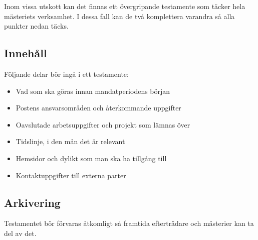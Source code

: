 \documentclass[]{dsekprotokoll}
\begin{document}
Inom vissa utskott kan det finnas ett övergripande testamente som täcker hela mästeriets verksamhet. I dessa fall kan de två komplettera varandra så alla punkter nedan täcks.

\subsection{Innehåll}
Följande delar bör ingå i ett testamente:
\begin{itemize}
    \item Vad som ska göras innan mandatperiodens början
    \item Postens ansvarsområden och återkommande uppgifter
    \item Oavslutade arbetsuppgifter och projekt som lämnas över
    \item Tidslinje, i den mån det är relevant
    \item Hemsidor och dylikt som man ska ha tillgång till
    \item Kontaktuppgifter till externa parter
\end{itemize}

\subsection{Arkivering}
Testamentet bör förvaras åtkomligt så framtida efterträdare och mästerier kan ta del av det.
\end{document}
